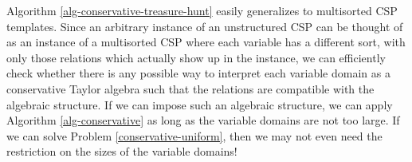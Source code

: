 \begin{rem} Algorithm \ref{alg-conservative-treasure-hunt} easily generalizes to multisorted CSP templates. Since an arbitrary instance of an unstructured CSP can be thought of as an instance of a multisorted CSP where each variable has a different sort, with only those relations which actually show up in the instance, we can efficiently check whether there is any possible way to interpret each variable domain as a conservative Taylor algebra such that the relations are compatible with the algebraic structure. If we can impose such an algebraic structure, we can apply Algorithm \ref{alg-conservative} as long as the variable domains are not too large. If we can solve Problem \ref{conservative-uniform}, then we may not even need the restriction on the sizes of the variable domains!

\end{rem}


